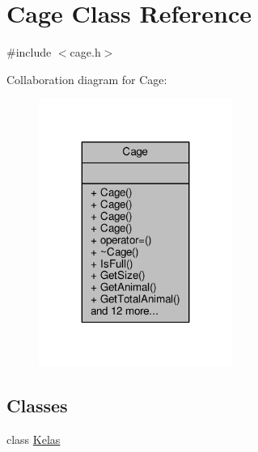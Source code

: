 \hypertarget{classCage}{}\section{Cage Class Reference}
\label{classCage}


{\ttfamily \#include $<$cage.\+h$>$}



Collaboration diagram for Cage\+:
\nopagebreak
\begin{figure}[H]
\begin{center}
\leavevmode
\includegraphics[width=179pt]{classCage__coll__graph}
\end{center}
\end{figure}
\subsection*{Classes}
\begin{DoxyCompactItemize}
\item 
class \hyperlink{classCage_1_1Kelas}{Kelas}
\end{DoxyCompactItemize}
